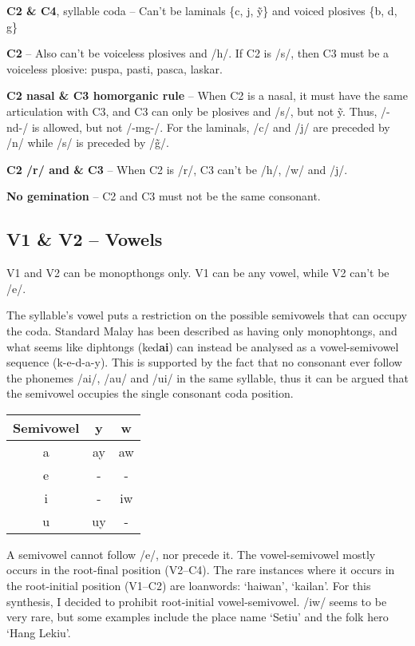 \documentclass{article}
\begin{document}
\textbf{C2 \& C4}, syllable coda -- Can't be laminals \{c, j, \~y\} and voiced plosives \{b, d, g\}

\textbf{C2} -- Also can't be voiceless plosives and /h/. If C2 is /s/, then C3 must be a voiceless plosive: puspa, pasti, pasca, laskar.

\textbf{C2 nasal \& C3 homorganic rule} -- When C2 is a nasal, it must have the same articulation with C3, and C3 can only be plosives and /s/, but not \~y. Thus, /-nd-/ is allowed, but not /-mg-/. For the laminals, /c/ and /j/ are preceded by /n/ while /s/ is preceded by /\~g/.

\textbf{C2 /r/ and \& C3} -- When C2 is /r/, C3 can't be /h/, /w/ and /j/.

\textbf{No gemination} -- C2 and C3 must not be the same consonant.

\subsection*{V1 \& V2 -- Vowels}

V1 and V2 can be monopthongs only. V1 can be any vowel, while V2 can't be /e/.

The syllable's vowel puts a restriction on the possible semivowels that can occupy the coda. Standard Malay has been described as having only monophtongs, and what seems like diphtongs (ked\textbf{ai}) can instead be analysed as a vowel-semivowel sequence (k-e-d-a-y). This is supported by the fact that no consonant ever follow the phonemes /ai/, /au/ and /ui/ in the same syllable, thus it can be argued that the semivowel occupies the single consonant coda position.

\begin{center}
	\begin{tabular}{c c c}
		\toprule
		Semivowel & y  & w  \\ \midrule
		    a     & ay & aw \\
		    e     & -  & -  \\
		    i     & -  & iw \\
		    u     & uy & -  \\ \bottomrule
	\end{tabular}
\end{center}

A semivowel cannot follow /e/, nor precede it. The vowel-semivowel mostly occurs in the root-final position (V2--C4). The rare instances where it occurs in the root-initial position (V1--C2) are loanwords: `haiwan', `kailan'. For this synthesis, I decided to prohibit root-initial vowel-semivowel. /iw/ seems to be very rare, but some examples include the place name `Setiu' and the folk hero `Hang Lekiu'.
\end{document}
